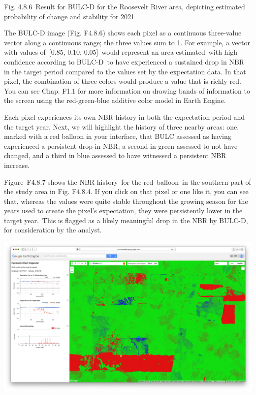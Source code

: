 \documentclass[
  letterpaper,
  DIV=11,
  numbers=noendperiod]{scrreprt}
\begin{document}
Fig. 4.8.6~Result for BULC-D for the Roosevelt River area, depicting
estimated probability of change and stability for 2021

The BULC-D image (Fig. F4.8.6) shows each pixel as a continuous
three-value vector along a continuous range; the three values sum to 1.
For example, a vector with values of~{[}0.85, 0.10, 0.05{]}~would
represent an area estimated~with high confidence according to BULC-D~to
have experienced a sustained drop in NBR in the target period compared
to the values set by the expectation data. In that pixel, the
combination of three colors would produce a value that is richly red.
You can see Chap. F1.1 for more information on drawing bands of
information to the screen using the red-green-blue additive color model
in Earth Engine.

Each pixel experiences its own NBR history in both the expectation
period and the target year. Next, we will highlight the history of three
nearby areas: one, marked with a red balloon in your interface, that
BULC assessed as having experienced a persistent drop in NBR; a second
in green assessed to not have changed, and a third in blue assessed to
have witnessed a persistent NBR increase.~

Figure~F4.8.7 shows the NBR history~for the red~balloon~in the southern
part of the study area in Fig. F4.8.4. If you click on that pixel or one
like it, you can see that, whereas the values were quite stable
throughout the growing season for the years used to create the pixel's
expectation, they were persistently lower in the target year.~This is
flagged as a likely meaningful drop in the NBR by BULC-D, for
consideration by the analyst.

\includegraphics{./F4/image79.png}~ ~ ~ ~ ~ ~ ~ ~ ~ ~ ~ ~ ~ ~ ~ ~ ~ ~ ~
~ ~ ~ ~ ~ ~ ~ ~ ~ ~ ~ ~ ~ ~ ~ ~ ~ ~ ~ ~ ~ ~ ~ ~ ~
\end{document}
